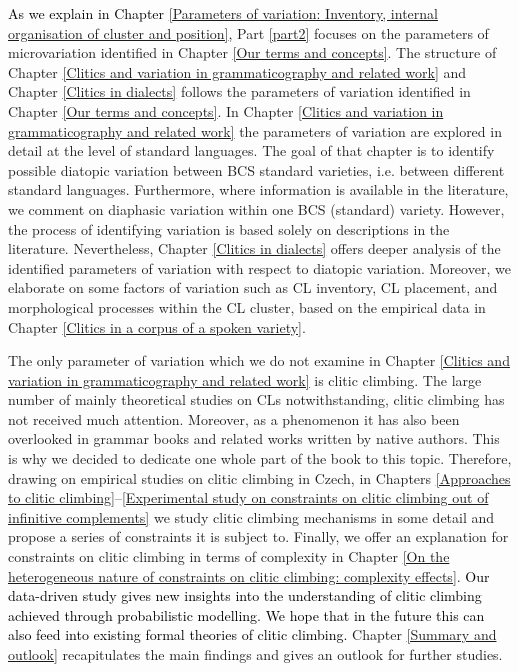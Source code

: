 \textcolor{black}{As we explain in Chapter \ref{Parameters of variation: Inventory, internal organisation of cluster and position},} Part \ref{part2} focuses on the parameters of microvariation identified in Chapter \ref{Our terms and concepts}. The structure of Chapter \ref{Clitics and variation in grammaticography and related work} and Chapter \ref{Clitics in dialects} follows the parameters of variation identified in Chapter \ref{Our terms and concepts}. In Chapter \ref{Clitics and variation in grammaticography and related work} the parameters of variation are explored in detail at the level of standard languages. The goal of that chapter is to identify possible diatopic variation between BCS standard varieties, i.e. between different standard languages. Furthermore, where information is available in the literature, we comment on diaphasic variation within one BCS (standard) variety. However, the process of identifying variation is based solely on descriptions in the literature. Nevertheless, Chapter \ref{Clitics in dialects} offers deeper analysis of the identified parameters of variation with respect to diatopic variation. Moreover, we elaborate on some factors of variation such as CL inventory, CL placement, and morphological processes within the CL cluster, based on the empirical data in Chapter \ref{Clitics in a corpus of a spoken variety}.

The only parameter of variation which we do not examine in Chapter \ref{Clitics and variation in grammaticography and related work} is clitic climbing. The large number of mainly theoretical studies on CLs notwithstanding, clitic climbing has not received much attention. Moreover, as a phenomenon it has also been overlooked in grammar books and related works written by native authors. This is why we decided to dedicate one whole part of the book to this topic. Therefore, drawing on empirical studies on clitic climbing in Czech, in Chapters \ref{Approaches to clitic climbing}--\ref{Experimental study on constraints on clitic climbing out of infinitive complements} we study clitic climbing mechanisms in some detail and propose a series of constraints it is subject to. Finally, we offer an explanation for constraints on clitic climbing in terms of complexity in Chapter \ref{On the heterogeneous nature of constraints on clitic climbing: complexity effects}. \textcolor{black}{Our data-driven study gives new insights into the understanding of clitic climbing achieved through probabilistic modelling. We hope that in the future this can also feed into existing formal theories of clitic climbing.} Chapter \ref{Summary and outlook} recapitulates the main findings and gives an outlook for further studies.
